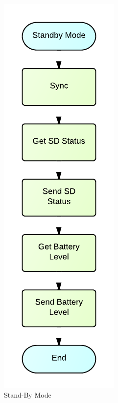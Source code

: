 \begin{figure}[H]
	\centering
	\includegraphics[scale=1.0]{img/StandByMode.pdf}
	\caption{Stand-By Mode \label{fig:standByMode}}
\end{figure}